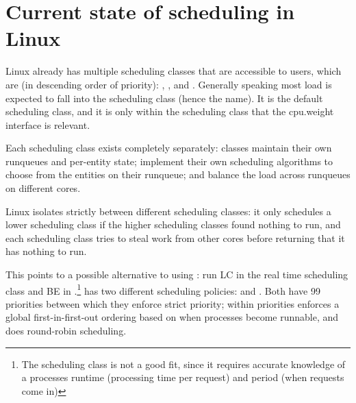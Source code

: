 \section{Current state of scheduling in Linux}\label{s:existing}


Linux already has multiple scheduling classes that are accessible to users,
which are (in descending order of priority): \deadlineclass{}, \rtclass{}, and
\normalclass{}. Generally speaking most load is expected to fall into the
\normalclass{} scheduling class (hence the name). It is the default scheduling
class, and it is only within the \normalclass{} scheduling class that the
\cgroups{} cpu.weight interface is relevant.

Each scheduling class exists completely separately: classes maintain their own
runqueues and per-entity state; implement their own scheduling algorithms to
choose from the entities on their runqueue; and balance the load across
runqueues on different cores. 

Linux isolates strictly between different scheduling classes: it only schedules
a lower scheduling class if the higher scheduling classes found nothing to run,
and each scheduling class tries to steal work from other cores before returning
that it has nothing to run.

This points to a possible alternative to using \cgroups{}: run LC in the real
time \rtclass{} scheduling class and BE in \normalclass{}.\footnote{The
\deadlineclass{} scheduling class is not a good fit, since it requires accurate
knowledge of a processes runtime (processing time per request) and period (when
requests come in)} \rtclass{} has two different scheduling policies:
\schedfifo{} and \schedrr{}. Both have 99 priorities between which they enforce
strict priority; within priorities \schedfifo{} enforces a global
first-in-first-out ordering based on when processes become runnable, and
\schedrr{} does round-robin scheduling.

